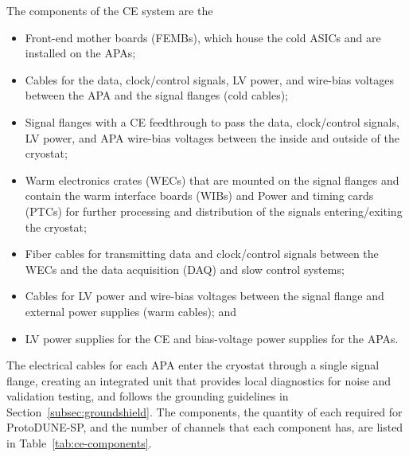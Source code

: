 The components of the CE system are the
\begin{itemize}
\item Front-end mother boards (FEMBs), which house the cold ASICs and are installed on the APAs;
\item Cables for the data, clock/control signals, LV power, and wire-bias voltages 
between the APA and the signal flanges (cold cables);
\item Signal flanges with a CE feedthrough to pass the data, clock/control signals, 
LV power, and APA wire-bias voltages between the inside and outside of the cryostat;
\item Warm electronics crates (WECs) that are mounted on the signal flanges and contain the warm interface boards (WIBs)
and Power and timing cards (PTCs) for further processing and distribution of the signals entering/exiting the cryostat;
\item Fiber cables for transmitting data and clock/control signals between the WECs and the data acquisition 
(DAQ) and slow control systems;
\item Cables for LV power and wire-bias voltages between the signal flange and external power supplies (warm cables); and
\item LV power supplies for the CE and bias-voltage power supplies for the APAs.
\end{itemize}

The electrical cables for each APA enter the cryostat through a single 
signal flange, creating an integrated unit that provides local diagnostics for noise and validation testing,
and follows the grounding guidelines in Section~\ref{subsec:groundshield}. The components, the quantity of each required for ProtoDUNE-SP, and the number of channels that each component has, are listed in Table~\ref{tab:ce-components}.

